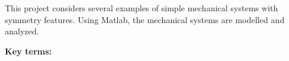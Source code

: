 \begin{tcolorbox}[title=Abstract,colbacktitle=white!80!black,coltitle=black,arc=0mm,boxrule=0.1mm]
This project considers several examples of simple mechanical systems with symmetry features. Using Matlab, the mechanical systems are modelled and analyzed.

\vspace{5mm}

\textbf{Key terms: } 
\end{tcolorbox}